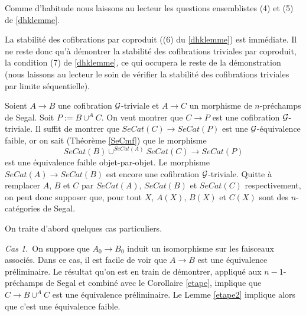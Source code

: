 \documentclass[12pt]{article}
\newcommand{\Gg}{{\cal G}}
\begin{document}
Comme d'habitude nous laissons au lecteur les questions ensemblistes
(4) et (5) de \ref{dhklemme}.


La stabilit\'e des cofibrations par
coproduit ((6) du \ref{dhklemme}) est imm\'ediate.
Il ne reste donc qu'\`a d\'emontrer la stabilit\'e des cofibrations
triviales par coproduit, la condition (7) de \ref{dhklemme}, ce qui
occupera le reste de la
d\'emonstration (nous laissons au lecteur le soin de v\'erifier la
stabilit\'e des
cofibrations triviales par limite s\'equentielle).

Soient $A\rightarrow B$ une cofibration $\Gg$-triviale
et $A\rightarrow C$ un morphisme de
$n$-pr\'echamps de Segal. Soit $P:= B\cup ^AC$. On veut montrer que
$C\rightarrow P$ est une cofibration $\Gg$-triviale.  Il suffit de montrer
que $SeCat(C)\rightarrow SeCat(P)$ est une $\Gg$-\'equivalence faible, or on
sait (Th\'eor\`eme \ref{SeCmf}) que le morphisme
$$
SeCat(B)\cup ^{SeCat(A)}SeCat(C) \rightarrow SeCat(P)
$$
est une \'equivalence faible objet-par-objet. Le morphisme $SeCat(A)\rightarrow
SeCat(B)$ est encore une cofibration $\Gg$-triviale. Quitte \`a remplacer
$A$, $B$ et $C$ par $SeCat(A)$, $SeCat(B)$ et $SeCat(C)$ respectivement, on peut
donc supposer que, pour tout $X$,  $A(X)$, $B(X)$ et $C(X)$ sont des
$n$-cat\'egories de
Segal.

On traite d'abord quelques cas particuliers.

\noindent
{\em Cas 1.}\,  On suppose que $A_0\rightarrow B_0$ induit un isomorphisme
sur les
faisceaux associ\'es. Dans ce cas, il est facile de voir que $A\rightarrow
B$ est
une \'equivalence pr\'eliminaire. Le r\'esultat qu'on est en train de
d\'emontrer,
appliqu\'e aux $n-1$-pr\'echamps de Segal et combin\'e avec le Corollaire
\ref{etape},
implique que $C\rightarrow B\cup ^AC$ est une \'equivalence pr\'eliminaire.
Le Lemme \ref{etape2} implique alors que c'est une \'equivalence faible.
\end{document}
